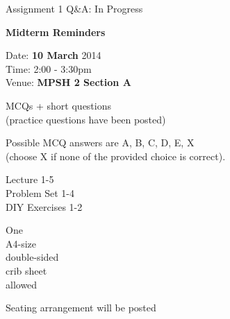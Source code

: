\begin{cf}
	Assignment 1 Q\&A: In Progress
\end{cf}

\begin{cf}{
		\textbf{Midterm Reminders}
}
\end{cf}

\begin{cf}
		Date: \textbf{10 March} 2014\\
		Time: 2:00 - 3:30pm\\
		Venue: \textbf{\color{red} MPSH 2 Section A}\\
\end{cf}

\begin{cf}
MCQs + short questions\\
(practice questions have been posted)
\end{cf}

\begin{cf}
Possible MCQ answers are A, B, C, D, E, X\\
(choose X if none of the provided choice is correct).
\end{cf}

\begin{cf}
Lecture 1-5\\
Problem Set 1-4\\
DIY Exercises 1-2\\
\end{cf}

\begin{cf}
	One\\
	A4-size\\
	double-sided\\
	crib sheet\\
	allowed
\end{cf}

\begin{cf}
	Seating arrangement 
	will be posted
\end{cf}
